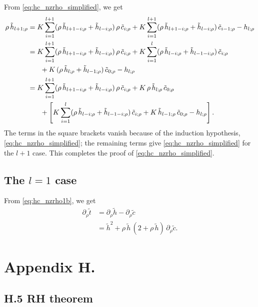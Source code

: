 \documentclass[preprint]{revtex4-1}
\numberwithin{equation}{subsection}
\numberwithin{table}{section}
\begin{document}
From \eqref{eq:hc_nzrho_simplified},
we get
\begin{align*}
  \rho \, \tilde h_{l+1;\rho}
&=
  K \sum_{i = 1}^{l+1}
  (\rho \, \tilde h_{l+1-i;\rho} + \tilde h_{l-i;\rho}) \,
  \rho \, \tilde c_{i;\rho}
+
  K \sum_{i = 1}^{l+1}
  (\rho \, \tilde h_{l+1-i;\rho} + \tilde h_{l-i;\rho}) \,
  \tilde c_{i-1;\rho}
-
  h_{l;\rho}
%
%
%
\\
&=
  K \sum_{i = 1}^{l+1}
  (\rho \, \tilde h_{l+1-i;\rho} + \tilde h_{l-i;\rho}) \,
  \rho \, \tilde c_{i;\rho}
+
  K \sum_{i = 1}^{l}
  (\rho \, \tilde h_{l-i;\rho} + \tilde h_{l-1-i;\rho}) \,
  \tilde c_{i;\rho}
\\
&\hphantom{=\quad}
+ K \,
  (\rho \, \tilde h_{l;\rho} + \tilde h_{l-1;\rho}) \,
  \tilde c_{0;\rho}
-
  h_{l;\rho}
%
%
%
\\
&=
  K \sum_{i = 1}^{l+1}
  (\rho \, \tilde h_{l+1-i;\rho} + \tilde h_{l-i;\rho}) \,
  \rho \, \tilde c_{i;\rho}
+ K \,
  \rho \, \tilde h_{l;\rho} \,
  \tilde c_{0;\rho}
\\
&\hphantom{=\quad}
+
\left[
  K \sum_{i = 1}^{l}
  (\rho \, \tilde h_{l-i;\rho} + \tilde h_{l-1-i;\rho}) \,
  \tilde c_{i;\rho}
+ K \,
  \tilde h_{l-1;\rho} \,
  \tilde c_{0;\rho}
-
  h_{l;\rho}
\right].
%
%
%
\end{align*}
The terms in the square brackets vanish because of the induction hypothesis,
\eqref{eq:hc_nzrho_simplified};
the remaining terms give
\eqref{eq:hc_nzrho_simplified}
for the $l + 1$ case.
This completes the proof of
\eqref{eq:hc_nzrho_simplified}.




\subsection{The $l = 1$ case}

From \eqref{eq:hc_nzrho1b},
we get
\begin{align*}
\partial_\rho \tilde t
&=
\partial_\rho \tilde h
-
\partial_\rho \tilde c
\\
&=
\tilde h^2
+
\rho \, \tilde h \,
(2 + \rho \, \tilde h) \,
\partial_\rho \tilde c.
\end{align*}



\section{Appendix H.}



\subsection{H.5 RH theorem}
\end{document}
